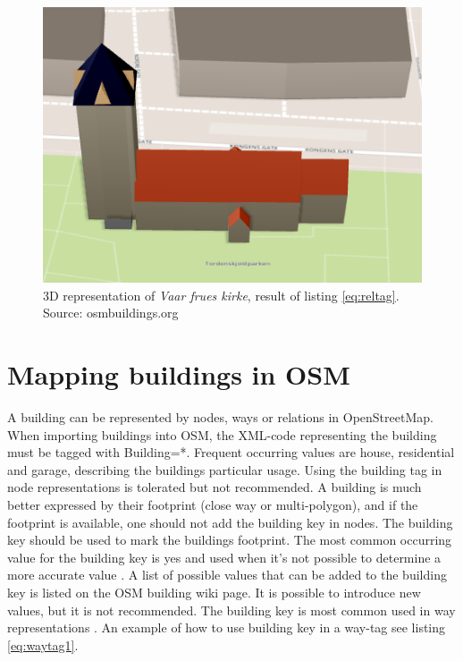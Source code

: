 \begin{figure}[H]
    \centering
    \includegraphics[scale=0.5]{figures/FixedByMe/fruekirke.png}
    \caption{3D representation of \textit{Vaar frues kirke}, result of listing \ref{eq:reltag}. Source: osmbuildings.org}
    \label{fig:fruekirke}
\end{figure}


 \section{Mapping buildings in OSM}\label{buildOSM}
A building can be represented by nodes, ways or relations in OpenStreetMap. When importing buildings into OSM, the XML-code representing the building must be tagged with Building=*. Frequent occurring values are house, residential and garage, describing the buildings particular usage.  Using the building tag in node representations is tolerated but not recommended. A building is much better expressed by their footprint (close way or multi-polygon), and if the footprint is available, one should not add the building key in nodes. The building key should be used to mark the buildings footprint. The most common occurring value for the building key is yes and used when it's not possible to determine a more accurate value \cite{OpenStreetMapf}. A list of possible values that can be added to the building key is listed on the OSM building wiki page. It is possible to introduce new values, but it is not recommended. The building key is most common used in way representations \cite{TagInfo2016}. An example of how to use building key in a way-tag see listing \ref{eq:waytag1}.

